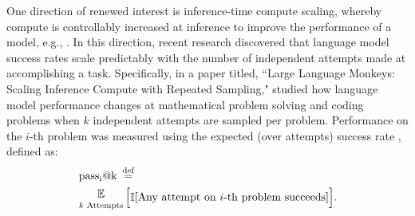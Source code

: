 One direction of renewed interest is inference-time compute scaling, whereby compute is controllably increased at inference to improve the performance of a model, e.g., \citet{openai2024o1}. In this direction, recent research discovered that language model success rates scale predictably with the number of independent attempts made at accomplishing a task.
Specifically, in a paper titled, ``Large Language Monkeys: Scaling Inference Compute with Repeated Sampling," \citet{brown2024largelanguagemonkeysscaling} studied how language model performance changes at mathematical problem solving and coding problems when $k$ independent attempts are sampled per problem. Performance on the $i$-th problem was measured using the expected (over attempts) success rate \citep{kulal2019spoc,chen2021evaluatinglargelanguagemodels}, defined as:
%
\begin{equation}
\begin{aligned}
&\operatorname{pass_i@k} \, \defeq \, \\
&\mathop{\raisebox{3pt}{$\mathbb{E}$}}_{\substack{k \text{ Attempts}}}\Big[ \mathbb{I}[\text{Any attempt on $i$-th problem succeeds}] \Big].
\end{aligned}
\end{equation}


